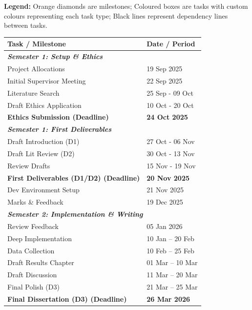 \documentclass[12pt,nonacm,acmlarge,titlepage,screen]{acmart}
\begin{document}
\textbf{Legend:} Orange diamonds are milestones; Coloured boxes are tasks with custom colours representing each task type; Black lines represent dependency lines between tasks.

\begin{table}[htbp]
    \centering
    \small
    \renewcommand{\arraystretch}{1.3} %
    
    \begin{tabularx}{\textwidth}{| X | l |}
        \hline
        \textbf{Task / Milestone} & \textbf{Date / Period} \\
        \hline
        
        \multicolumn{2}{|l|}{\textit{\textbf{Semester 1: Setup \& Ethics}}} \\
        \hline
        Project Allocations & 19 Sep 2025 \\
        \hline
        Initial Supervisor Meeting & 22 Sep 2025 \\
        \hline
        Literature Search & 25 Sep - 09 Oct \\
        \hline
        Draft Ethics Application & 10 Oct - 20 Oct \\
        \hline
        \textbf{Ethics Submission (Deadline)} & \textbf{24 Oct 2025} \\
        \hline
        
        \multicolumn{2}{|l|}{\textit{\textbf{Semester 1: First Deliverables}}} \\
        \hline
        Draft Introduction (D1) & 27 Oct - 06 Nov \\
        \hline
        Draft Lit Review (D2) & 30 Oct - 13 Nov \\
        \hline
        Review Drafts & 15 Nov - 19 Nov \\
        \hline
        \textbf{First Deliverables (D1/D2) (Deadline)} & \textbf{20 Nov 2025} \\
        \hline
        Dev Environment Setup & 21 Nov 2025 \\
        \hline
        Marks \& Feedback & 19 Dec 2025 \\
        \hline
        
        \multicolumn{2}{|l|}{\textit{\textbf{Semester 2: Implementation \& Writing}}} \\
        \hline
        Review Feedback & 05 Jan 2026 \\
        \hline
        Deep Implementation & 10 Jan -- 20 Feb \\
        \hline
        Data Collection & 10 Feb -- 25 Feb \\
        \hline
        Draft Results Chapter & 01 Mar -- 10 Mar \\
        \hline
        Draft Discussion & 11 Mar -- 20 Mar \\
        \hline
        Final Polish (D3) & 21 Mar -- 25 Mar \\
        \hline
        \textbf{Final Dissertation (D3) (Deadline)} & \textbf{26 Mar 2026} \\
        \hline
        

\end{tabularx}
\end{table}
\end{document}
